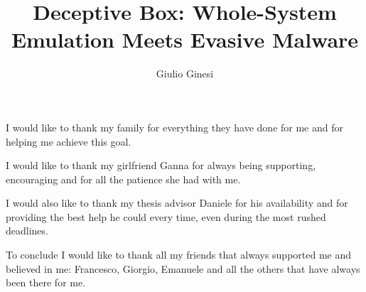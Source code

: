 \documentclass[LaM,binding=0.6cm]{sapthesis}
\title{Deceptive Box: Whole-System Emulation Meets Evasive Malware}
\author{Giulio Ginesi}
\newcounter{t0d0_counter}
\begin{document}
\frontmatter

\maketitle

\dedication{A (G)Anna}


\begin{acknowledgments}
I would like to thank my family for everything they have done for me and for helping me achieve this goal.

\bigskip
\noindent I would like to thank my girlfriend Ganna for always being supporting, encouraging and for all the patience she had with me.  

\bigskip 
\noindent I would also like to thank my thesis advisor Daniele for his availability and for providing the best help he could every time, even during the most rushed deadlines.

\bigskip
\noindent To conclude I would like to thank all my friends that always supported me and believed in me: Francesco, Giorgio, Emanuele and all the others that have always been there for me.

\end{acknowledgments}

\tableofcontents

\mainmatter








\backmatter
\cleardoublepage
{}
\end{document}
